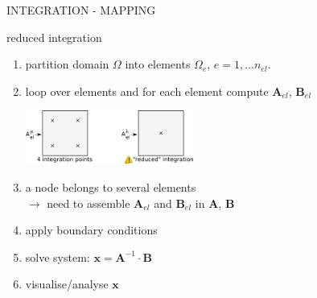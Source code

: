 INTEGRATION - MAPPING 

reduced integration \cite{hulb79}

\begin{enumerate}

\item partition domain $\Omega$ into elements $\Omega_e$, $e=1, ... n_{el}$.


\item loop over elements and for each element compute ${\bm A}_{el}$, ${\bm B}_{el}$ \\
\begin{center}
\includegraphics[width=5.5cm]{images/integration.png}
\end{center}



\item a node belongs to several elements\\
      $\rightarrow$ need to assemble ${\bm A}_{el}$ and ${\bm B}_{el}$ in ${\bm A}$, ${\bm B}$

\item apply boundary conditions

\item solve system: ${\bm x}= {\bm A}^{-1} \cdot {\bm B}$
\item visualise/analyse ${\bm x}$
\end{enumerate}
